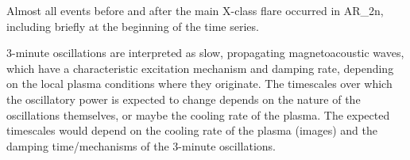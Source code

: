 Almost all events before and after the main X-class flare
occurred in AR\_2n, including briefly at the beginning of the time series.



3-minute oscillations are interpreted as slow, propagating magnetoacoustic waves,
which have a characteristic excitation mechanism and damping rate,
depending on the local plasma conditions where they originate.
The timescales over which the oscillatory power is expected to change
depends on the nature of the oscillations themselves,
or maybe the cooling rate of the plasma.
The expected timescales would depend on the cooling rate of the plasma
(images) and the damping time/mechanisms of the 3-minute oscillations.
